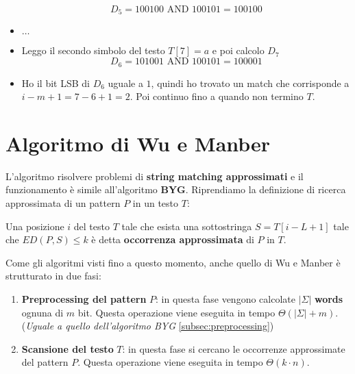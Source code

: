 \begin{esempio}
\begin{itemize}
              \begin{equation}
                  D_5 = 100100 \text{ AND } 100101 = 100100
              \end{equation}
        \item $\dots$
        \item Leggo il secondo simbolo del testo $T[7] = a$ e poi calcolo $D_7$
              \begin{equation}
                  D_6 = 101001 \text{ AND } 100101 = 100001
              \end{equation}
        \item Ho il bit LSB di $D_6$ uguale a $1$, quindi ho trovato un match che
              corrisponde a $i - m + 1 = 7 - 6 + 1 = 2$. Poi continuo fino a
              quando non termino $T$.
    \end{itemize}
\end{esempio}
\section{Algoritmo di Wu e Manber}
L'algoritmo risolvere problemi di \textbf{string matching approssimati} e il
funzionamento è simile all'algoritmo \textbf{BYG}.
Riprendiamo la definizione di ricerca approssimata di un pattern $P$ in un testo
$T$:
\begin{definizione}
    Una posizione $i$ del testo $T$ tale che esista una sottostringa $S = T[i -
                L + 1]$ tale che $ED(P, S) \leq k$ è detta \textbf{occorrenza
        approssimata} di $P$ in $T$.
\end{definizione}
Come gli algoritmi visti fino a questo momento, anche quello di Wu e Manber è
strutturato in due fasi:
\begin{enumerate}
    \item \textbf{Preprocessing del pattern} $P$: in questa fase vengono calcolate
          $|\Sigma|$ \textbf{words} ognuna di $m$ bit. Questa operazione viene
          eseguita in tempo $\Theta(|\Sigma| + m)$. (\textit{Uguale a quello
              dell'algoritmo BYG} \ref{subsec:preprocessing})
    \item \textbf{Scansione del testo} $T$: in questa fase si cercano le occorrenze
          approssimate del pattern $P$. Questa operazione viene eseguita in
          tempo $\Theta(k \cdot n)$.
\end{enumerate}
